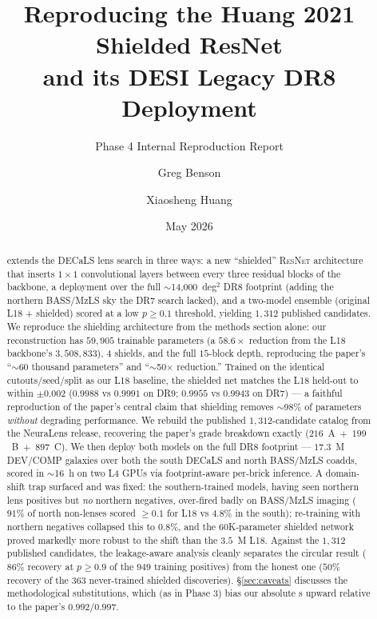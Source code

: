 \documentclass[11pt,letterpaper]{article}
\title{Reproducing the Huang 2021 Shielded ResNet\\
       and its DESI Legacy DR8 Deployment}
\author{Greg Benson \and Xiaosheng Huang}
\date{May 2026}
\newcommand{\ResNet}{\textsc{ResNet}}
\begin{document}
\maketitle
\subtitle{Phase 4 Internal Reproduction Report}

\begin{abstract}
\textcite{huang2021desi} extends the \textcite{huang2020decals} DECaLS lens
search in three ways: a new ``shielded'' \ResNet{} architecture that inserts
$1{\times}1$ convolutional layers between every three residual blocks of the
\textcite{lanusse2018cmu} backbone, a deployment over the full $\sim$14{,}000~deg$^2$
DR8 footprint (adding the northern BASS/MzLS sky the DR7 search lacked), and a
two-model ensemble (original L18 + shielded) scored at a low $p\ge0.1$ threshold,
yielding $1{,}312$ published candidates. We reproduce the shielding architecture
from the methods section alone: our reconstruction has $59{,}905$ trainable
parameters (a $58.6\times$ reduction from the L18 backbone's $3{,}508{,}833$),
$4$ shields, and the full $15$-block depth, reproducing the paper's
``$\sim$60 thousand parameters'' and ``$\sim$50$\times$ reduction.'' Trained on
the identical cutouts/seed/split as our L18 baseline, the shielded net matches
the L18 held-out \AUC{} to within $\pm0.002$ ($0.9988$ vs $0.9991$ on DR9;
$0.9955$ vs $0.9943$ on DR7) --- a faithful reproduction of the paper's central
claim that shielding removes $\sim$98\% of parameters \emph{without} degrading
performance. We rebuild the published $1{,}312$-candidate catalog from the
NeuraLens release, recovering the paper's grade breakdown exactly
($216$~A~$+$~$199$~B~$+$~$897$~C). We then deploy both models on the full DR8
footprint --- $17.3$~M DEV/COMP galaxies over both the south DECaLS and north
BASS/MzLS coadds, scored in $\sim$16~h on two L4 GPUs via footprint-aware
per-brick inference. A domain-shift trap surfaced and was fixed: the
southern-trained models, having seen northern lens positives but \emph{no}
northern negatives, over-fired badly on BASS/MzLS imaging ($91\%$ of north
non-lenses scored $\ge0.1$ for L18 vs $4.8\%$ in the south); re-training with
northern negatives collapsed this to $0.8\%$, and the $60$K-parameter shielded
network proved markedly more robust to the shift than the $3.5$~M L18. Against
the $1{,}312$ published candidates, the leakage-aware analysis cleanly separates
the circular result ($86\%$ recovery at $p\ge0.9$ of the $949$ training
positives) from the honest one ($50\%$ recovery of the $363$ never-trained
shielded discoveries). \S\ref{sec:caveats} discusses the methodological
substitutions, which (as in Phase 3) bias our absolute \AUC{}s upward relative
to the paper's $0.992/0.997$.
\end{abstract}
\end{document}

